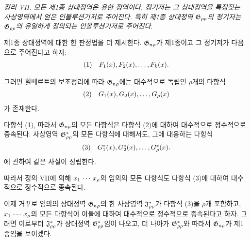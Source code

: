 \emph{정리 VII. 모든 제1종 상대정역은 유한 정역이다. 정기저는 그 상대정역을 특징짓는 사상영역에서 얻은 인볼루션기저로 주어진다. 특히 제1종 상대정역 $\mathfrak G_{\rho\rho}$의 정기저는 $\mathfrak G_{\rho\rho}$의 유일하게 정의되는 인볼루션기저로 주어진다.}

제1종 상대정역에 대한 한 판정법을 더 제시한다. $\mathfrak G_{n\rho}$가 제1종이고 그 정기저가 다음으로 주어진다고 하자:
\[
\begin{array}{@{}l@{\quad}c@{}}
(1)& F_1(x),F_2(x),\ldots,F_k(x).
\end{array}
\]

그러면 힐베르트의 보조정리에 따라 $\mathfrak G_{n\rho}$에는 대수적으로 독립인 $\rho$개의 다항식
\[
\begin{array}{@{}l@{\quad}c@{}}
(2)& G_1(x),G_2(x),\ldots,G_\rho(x)
\end{array}
\]
가 존재한다.

다항식 (1), 따라서 $\mathfrak G_{n\rho}$의 모든 다항식은 다항식 (2)에 대하여 대수적으로 정수적으로 종속된다. 사상영역 $\mathfrak G^*_{\rho\rho}$의 모든 다항식에 대해서도, 그에 대응하는 다항식
\[
\begin{array}{@{}l@{\quad}c@{}}
(3)& G_1^*(x),G_2^*(x),\ldots,G_\rho^*(x).
\end{array}
\]
에 관하여 같은 사실이 성립한다.

따라서 정의 VII에 의해 $x_1\,\cdots\, x_\rho$의 임의의 모든 다항식도 다항식 (3)에 대하여 대수적으로 정수적으로 종속된다.

이제 거꾸로 임의의 상대정역 $\mathfrak G_{n\rho}$의 한 사상영역 $\mathfrak J^*_{\rho\rho}$가 다항식 (3)을 $\rho$개 포함하고, $x_1\,\cdots\, x_\rho$의 모든 다항식이 이들에 대하여 대수적으로 정수적으로 종속된다고 하자. 그러면 이로부터 $\mathfrak J^*_{\rho\rho}$가 상대정역 $\mathfrak G^*_{\rho\rho}$임이 나오고, 더 나아가 $\mathfrak G^*_{\rho\rho}$와 따라서 $\mathfrak G_{n\rho}$가 제1종임을 보이겠다.


